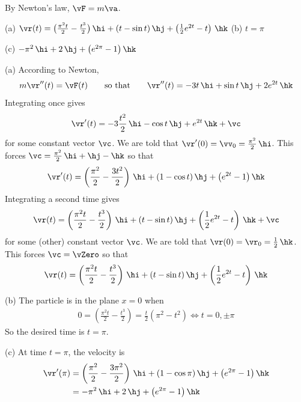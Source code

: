 \begin{hint} 
By Newton's law, $\vF=m\va$.
\end{hint}

\begin{answer} 
(a) $\vr(t) = \big(\frac{\pi^2 t}{2}-\frac{t^3}{2}\big)\,\hi + 
              (t- \sin t)\,\hj + \left(\frac{1}{2}e^{2t}-t\right)\,\hk$ \qquad
(b) $t=\pi$ 

(c) $-\pi^2\,\hi +2\,\hj + \big(e^{2\pi}-1\big)\,\hk$
\end{answer}

\begin{solution} (a)
According to Newton,
\begin{equation*}
m\vr''(t) = \vF(t)\qquad\text{so that}\qquad
\vr''(t) = -3t\,\hi + \sin t\,\hj + 2e^{2t}\,\hk
\end{equation*}
Integrating once gives
\begin{align*}
\vr'(t) = -3\frac{t^2}{2}\,\hi - \cos t\,\hj + e^{2t}\,\hk +\vc
\end{align*}
for some constant vector $\vc$. We are told that $\vr'(0)=\vv_0
=\frac{\pi^2}{2}\,\hi$. This forces $\vc=\frac{\pi^2}{2}\,\hi+\hj-\hk$
so that
\begin{align*}
\vr'(t) = \left(\frac{\pi^2}{2}-\frac{3t^2}{2}\right)\,\hi +(1- \cos t)\,\hj + \big(e^{2t}-1\big)\,\hk 
\end{align*}
Integrating a second time gives
\begin{align*}
\vr(t) = \left(\frac{\pi^2 t}{2}-\frac{t^3}{2}\right)\,\hi +(t- \sin t)\,\hj 
 + \left(\frac{1}{2}e^{2t}-t\right)\,\hk  + \vc
\end{align*}
for some (other) constant vector $\vc$.  We are told that $\vr(0)=\vr_0
=\frac{1}{2}\,\hk$. This forces $\vc=\vZero$
so that
\begin{align*}
\vr(t) = \left(\frac{\pi^2 t}{2}-\frac{t^3}{2}\right)\,\hi +(t- \sin t)\,\hj 
 + \left(\frac{1}{2}e^{2t}-t\right)\,\hk 
\end{align*}

(b) The particle is in the plane $x=0$ when
\begin{align*}
0=\left(\frac{\pi^2 t}{2}-\frac{t^3}{2}\right)
 =\frac{t}{2}(\pi^2-t^2) 
\iff t=0, \pm\pi
\end{align*}
So the desired time is $t=\pi$.

(c) At time $t=\pi$, the velocity is
\begin{align*}
\vr'(\pi) 
&= \left(\frac{\pi^2}{2}-\frac{3\pi^2}{2}\right)\,\hi +(1- \cos\pi)\,\hj +                 \big(e^{2\pi}-1\big)\,\hk \\
&= -\pi^2\,\hi +2\,\hj + \big(e^{2\pi}-1\big)\,\hk
\end{align*}

\end{solution}
